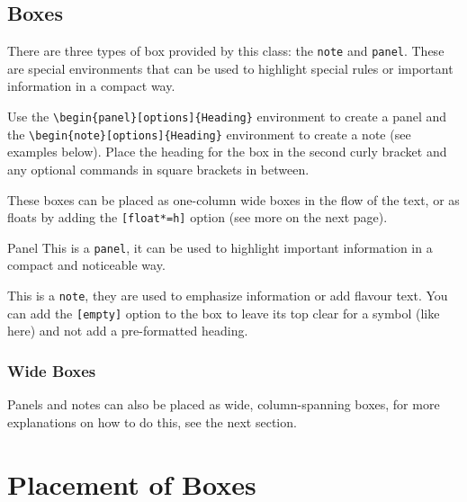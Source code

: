 \documentclass[english]{vaesen-supplement}
\begin{document}
\section{Boxes}

There are three types of box provided by this class: the \texttt{note} and \texttt{panel}. These are special environments that can be used to highlight special rules or important information in a compact way.

Use the \verb|\begin{panel}[options]{Heading}| environment to create a panel and the \verb|\begin{note}[options]{Heading}| environment to create a note (see examples below). Place the heading for the box in the second curly bracket and any optional commands in square brackets in between.

These boxes can be placed as one-column wide boxes in the flow of the text, or as floats by adding the \verb|[float*=h]| option (see more on the next page).

\begin{panel}{Panel}
    This is a \texttt{panel}, it can be used to highlight important information in a compact and noticeable way.
\end{panel}

\begin{note}[empty]{}
    \begin{center}
        \color{secret}
    \end{center}
    This is a \texttt{note}, they are used to emphasize information or add flavour text.
    You can add the \texttt{[empty]} option to the box to leave its top clear for a symbol (like here) and not add a pre-formatted heading.
\end{note}


\subsection{Wide Boxes}
Panels and notes can also be placed as wide, column-spanning boxes, for more explanations on how to do this, see the next section.


\chapter{Placement of Boxes}
\end{document}
